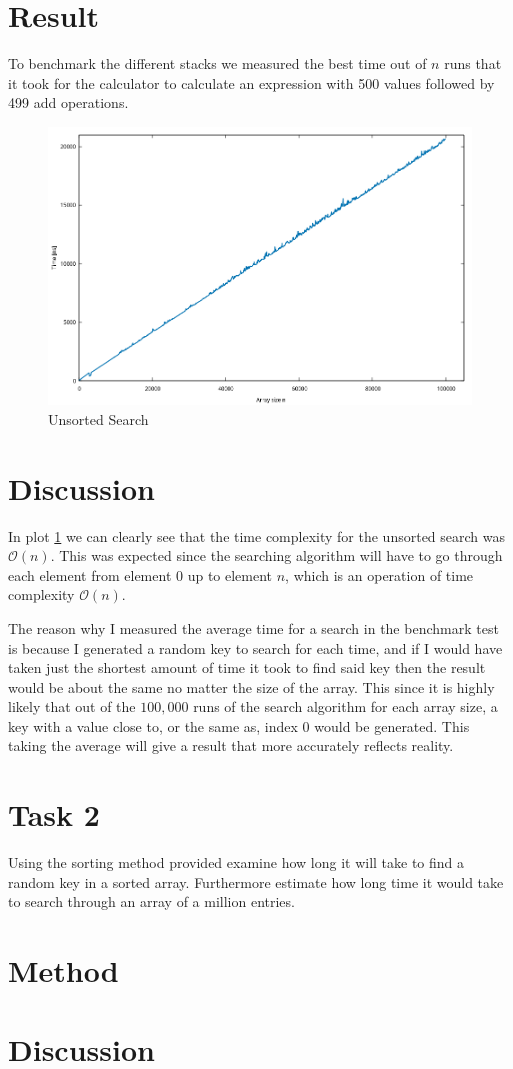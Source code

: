 \documentclass[a4paper,11pt]{article}
\begin{document}
\section*{Result}
To benchmark the different stacks we measured the best time out of $n$ runs that it took for the calculator to
calculate an expression with 500 values followed by 499 add operations.
\begin{figure}
  \centering
  \includegraphics[width=\textwidth]{unsortedSearch.png}
  \caption{Unsorted Search}
  \label{fig:unsortedSearch}
\end{figure}


\section*{Discussion}

In plot \ref{fig:unsortedSearch} we can clearly see that the time complexity for the unsorted search was $\mathcal{O}(n)$. This was expected since
the searching algorithm will have to go through each element from element $0$ up to element $n$, which is an operation of time complexity 
$\mathcal{O}(n)$. 

The reason why I measured the average time for a search in the benchmark test is because I generated a random key to search for each time, and 
if I would have taken just the shortest amount of time it took to find said key then the result would be about the same no matter the size of the
array. This  since it is highly likely that out of the $100,000$ runs of the search algorithm for each array size, a key with a value close to, or
the same as, index $0$ would be generated. This taking the average will give a result that more accurately reflects reality.

\section*{Task 2}

Using the sorting method provided examine how long it will take to find a random key in a sorted array. Furthermore estimate how long time it would 
take to search through an array of a million entries.
\section*{Method}



\section*{Discussion}
\end{document}
